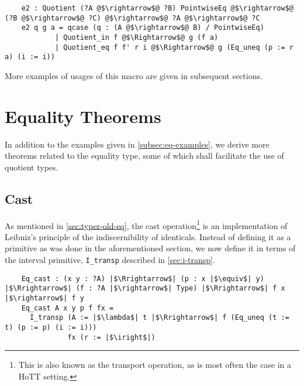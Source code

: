 \documentclass[12pt,twoside,maitrise]{dms}
\theoremstyle{definition}
\numberwithin{equation}{section}
\numberwithin{table}{chapter}
\numberwithin{figure}{chapter}
\newcommand\id[1] {\texttt{#1}}
\begin{document}
\begin{verbatim}
    e2 : Quotient (?A @$\rightarrow$@ ?B) PointwiseEq @$\rightarrow$@ (?B @$\rightarrow$@ ?C) @$\rightarrow$@ ?A @$\rightarrow$@ ?C
    e2 q g a = qcase (q : (A @$\rightarrow$@ B) / PointwiseEq)
            | Quotient_in f @$\Rightarrow$@ g (f a)
            | Quotient_eq f f' r i @$\Rightarrow$@ g (Eq_uneq (p := r a) (i := i))
\end{verbatim}

More examples of usages of this macro are given in subsequent sections.

\chapter{Equality Theorems}\label{ch:eq-theorems}
In addition to the examples given in \autoref{subsec:eq-examples}, we derive
more theorems related to the equality type, some of which shall facilitate the
use of quotient types.

\section{Cast}\label{sec:eq-transport}
As mentioned in \autoref{sec:typer-old-eq}, the cast operation\footnote{This is
also known as the transport operation, as is most often the case in a HoTT
setting.} is an implementation of Leibniz's principle of the indiscernibility of
identicals. Instead of defining it as a primitive as was done in the
aforementioned section, we now define it in terms of the interval primitive,
\id{I\_transp} described in \autoref{sec:i-transp}.


\begin{verbatim}
    Eq_cast : (x y : ?A) |$\Rrightarrow$| (p : x |$\equiv$| y) |$\Rrightarrow$| (f : ?A |$\rightarrow$| Type) |$\Rrightarrow$| f x |$\rightarrow$| f y
    Eq_cast A x y p f fx =
      I_transp (A := |$\lambda$| t |$\Rrightarrow$| f (Eq_uneq (t := t) (p := p) (i := i)))
               fx (r := |$\iright$|)
\end{verbatim}
\end{document}
